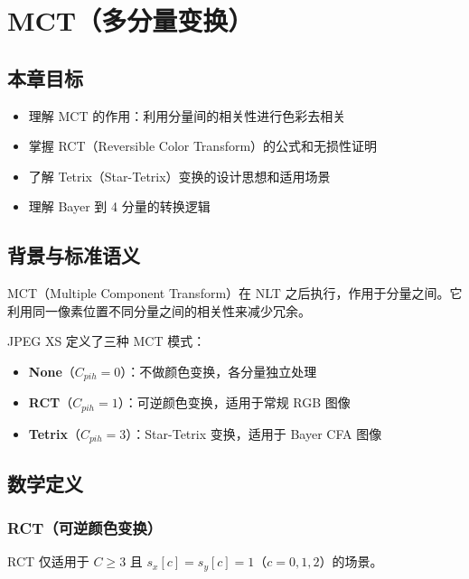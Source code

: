 
\chapter{MCT（多分量变换）}\label{ch:mct}

\section{本章目标}

\begin{itemize}
  \item 理解 MCT 的作用：利用分量间的相关性进行色彩去相关
  \item 掌握 RCT（Reversible Color Transform）的公式和无损性证明
  \item 了解 Tetrix（Star-Tetrix）变换的设计思想和适用场景
  \item 理解 Bayer 到 4 分量的转换逻辑
\end{itemize}

\section{背景与标准语义}

MCT（Multiple Component Transform）在 NLT 之后执行，作用于分量之间。它利用同一像素位置不同分量之间的相关性来减少冗余。

JPEG XS 定义了三种 MCT 模式：
\begin{itemize}
  \item \textbf{None}（$C_{pih} = 0$）：不做颜色变换，各分量独立处理
  \item \textbf{RCT}（$C_{pih} = 1$）：可逆颜色变换，适用于常规 RGB 图像
  \item \textbf{Tetrix}（$C_{pih} = 3$）：Star-Tetrix 变换，适用于 Bayer CFA 图像
\end{itemize}

\section{数学定义}

\subsection{RCT（可逆颜色变换）}

RCT 仅适用于 $C \geq 3$ 且 $s_x[c] = s_y[c] = 1$（$c = 0, 1, 2$）的场景。

